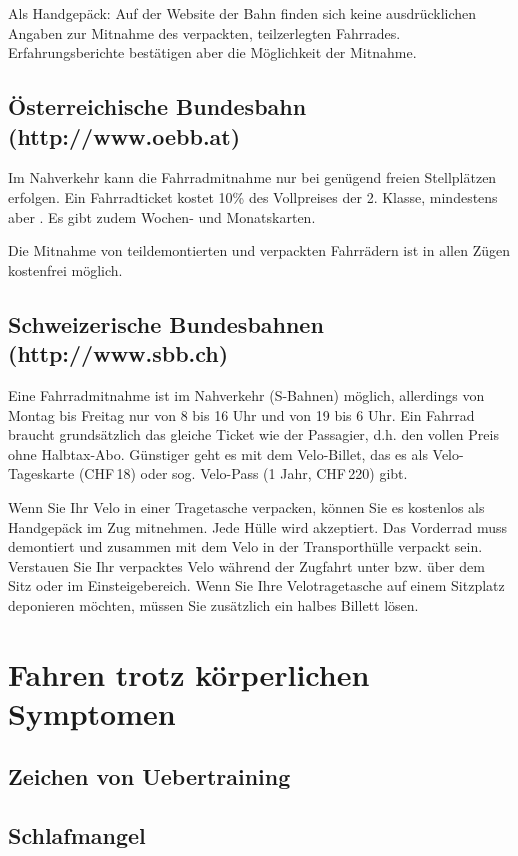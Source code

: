 Als Handgepäck: Auf der Website der Bahn finden sich keine ausdrücklichen Angaben zur Mitnahme des verpackten, teilzerlegten Fahrrades.
Erfahrungsberichte bestätigen aber die Möglichkeit der Mitnahme.

\subsection{Österreichische Bundesbahn (http://www.oebb.at)}
Im Nahverkehr kann die Fahrradmitnahme nur bei genügend freien Stellplätzen erfolgen.
Ein Fahrradticket kostet 10\% des Vollpreises der 2. Klasse, mindestens aber .
Es gibt zudem Wochen- und Monatskarten.

Die Mitnahme von teildemontierten und verpackten Fahrrädern ist in allen Zügen kostenfrei möglich.

\subsection{Schweizerische Bundesbahnen (http://www.sbb.ch)}
Eine Fahrradmitnahme ist im Nahverkehr (S-Bahnen) möglich, allerdings von Montag bis Freitag nur von 8 bis 16 Uhr und von 19 bis 6 Uhr.
Ein Fahrrad braucht grundsätzlich das gleiche Ticket wie der Passagier, d.h. den vollen Preis ohne Halbtax-Abo.
Günstiger geht es mit dem Velo-Billet, das es als Velo-Tageskarte (CHF\,18) oder sog. Velo-Pass (1 Jahr, CHF\,220) gibt.

Wenn Sie Ihr Velo in einer Tragetasche verpacken, können Sie es kostenlos als Handgepäck im Zug mitnehmen.
Jede Hülle wird akzeptiert. Das Vorderrad muss demontiert und zusammen mit dem Velo in der Transporthülle verpackt sein.
Verstauen Sie Ihr verpacktes Velo während der Zugfahrt unter bzw. über dem Sitz oder im Einsteigebereich.
Wenn Sie Ihre Velotragetasche auf einem Sitzplatz deponieren möchten, müssen Sie zusätzlich ein halbes Billett lösen.


\section{Fahren trotz körperlichen Symptomen}

\subsection{Zeichen von Uebertraining}

\subsection{Schlafmangel}

